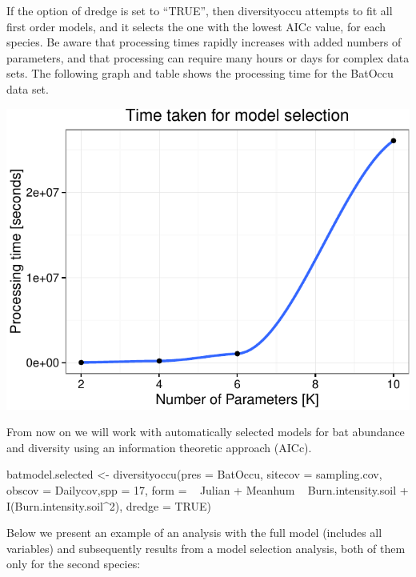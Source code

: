 \documentclass[article]{jss}
\begin{document}
If the option of dredge is set to ``TRUE'', then diversityoccu attempts
to fit all first order models, and it selects the one with the lowest
AICc value, for each species. Be aware that processing times rapidly
increases with added numbers of parameters, and that processing can
require many hours or days for complex data sets. The following graph
and table shows the processing time for the BatOccu data set.

\begin{CodeChunk}


\begin{center}\includegraphics{diversityocc_files/figure-latex/unnamed-chunk-11-1} \end{center}

\end{CodeChunk}

From now on we will work with automatically selected models for bat
abundance and diversity using an information theoretic approach (AICc).

\begin{CodeChunk}
\begin{CodeInput}
batmodel.selected <- diversityoccu(pres = BatOccu, sitecov = sampling.cov, obscov = Dailycov,spp = 17, form = ~ Julian + Meanhum ~ Burn.intensity.soil + I(Burn.intensity.soil^2), dredge = TRUE)
\end{CodeInput}
\end{CodeChunk}

Below we present an example of an analysis with the full model (includes
all variables) and subsequently results from a model selection analysis,
both of them only for the second species:
\end{document}
